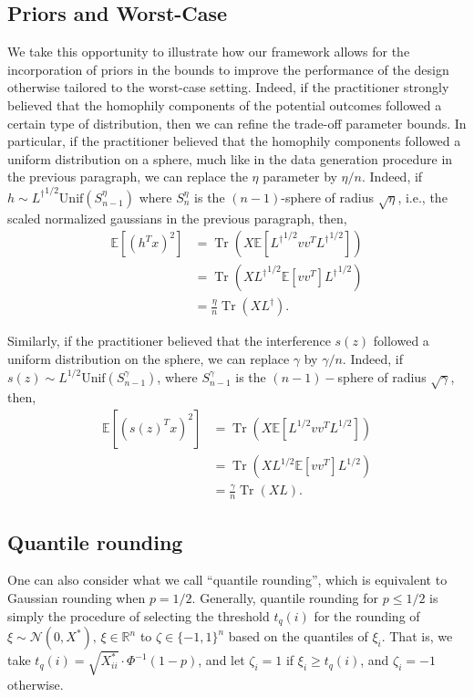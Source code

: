 \documentclass[12pt]{article}
\theoremstyle{definition}
\numberwithin{equation}{section}
\numberwithin{figure}{section}
\newcommand{\calN}{{\mathcal N}}
\numberwithin{equation}{section}
\numberwithin{figure}{section}
\begin{document}
\subsection{Priors and Worst-Case}

We take this opportunity to illustrate how our framework allows for the incorporation of priors in the bounds to improve the performance of the design otherwise tailored to the worst-case setting. Indeed, if the practitioner strongly believed that the homophily components of the potential outcomes followed a certain type of distribution, then we can refine the trade-off parameter bounds. In particular, if the practitioner believed that the homophily components followed a uniform distribution on a sphere, much like in the data generation procedure in the previous paragraph, we can replace the $\eta$ parameter by $\eta/n$. Indeed, if $h \sim {L^\dagger}^{1/2} \text{Unif}(S_{n-1}^\eta)$ where $S_n^\eta$ is the $(n-1)$-sphere of radius $\sqrt{\eta}$, i.e., the scaled normalized gaussians in the previous paragraph, then,
\begin{align*}
    \mathbb{E}[(h^T x)^2] &=   \operatorname{Tr}(X \mathbb{E}[{L^\dagger}^{1/2}vv^T{L^\dagger}^{1/2}]) \\
    &=  \operatorname{Tr}( X {L^\dagger}^{1/2}\mathbb{E}[vv^T]{L^\dagger}^{1/2})\\
    &= \frac{\eta}{n}  \operatorname{Tr}( X L^{\dagger}).
\end{align*}

Similarly, if the practitioner believed that the interference $s(z)$ followed a uniform distribution on the sphere, we can replace $\gamma$ by $\gamma/n$. Indeed, if $s(z) \sim L^{1/2} \text{Unif}(S_{n-1}^\gamma)$, where $S_{n-1}^\gamma$ is the $(n-1)-$sphere of radius $\sqrt{\gamma}$, then,
\begin{align*}
    \mathbb{E}[(s(z)^T x)^2] &=   \operatorname{Tr}(X \mathbb{E}[{L}^{1/2}vv^T{L}^{1/2}]) \\
    &=  \operatorname{Tr}( X {L}^{1/2}\mathbb{E}[vv^T]{L}^{1/2})\\
    &= \frac{\gamma}{n}  \operatorname{Tr}( X L).
\end{align*}

\subsection{Quantile rounding} \label{sec-quantile_rounding}
One can also consider what we call ``quantile rounding'', which is equivalent to Gaussian rounding when $p=1/2$. Generally, quantile rounding for $p \leq 1/2$ is simply the procedure of selecting the threshold $t_q(i)$ for the rounding of $\xi \sim \calN(0, X^*), \, \xi \in \mathbb{R}^n$ to $ \zeta \in \{-1,1\}^n$ based on the quantiles of $\xi_i$. That is, we take $t_q(i) = \sqrt{X^*_{ii}} \cdot \Phi^{-1}(1-p)$, and let $\zeta_i = 1$ if $\xi_i \geq t_q(i)$, and $\zeta_i = -1$ otherwise.
\end{document}

